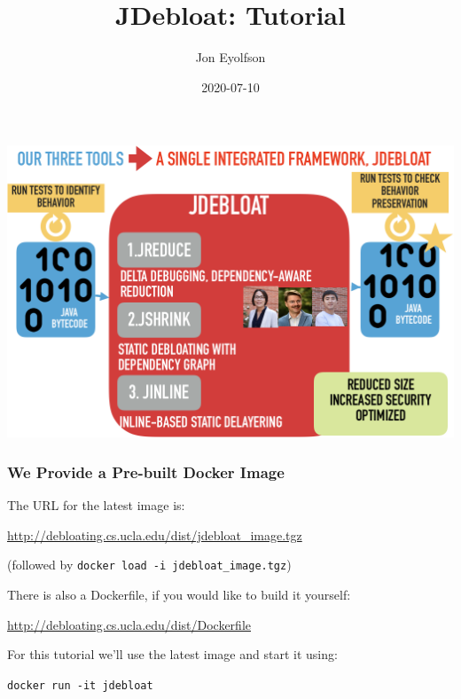 \documentclass[aspectratio=169]{beamer}
\title{JDebloat: Tutorial}
\author{Jon Eyolfson}
\date{2020-07-10}
\begin{document}
  \begin{frame}[plain]
    \titlepage
  \end{frame}

  \setcounter{framenumber}{0}

  \begin{frame}
    \centering
    \includegraphics[scale=0.3]{pi-overview.png}
  \end{frame}

  \begin{frame}
    \frametitle{We Provide a Pre-built Docker Image}

    The URL for the latest image is:

    \url{http://debloating.cs.ucla.edu/dist/jdebloat_image.tgz}

    (followed by \texttt{docker load -i jdebloat\_image.tgz})

    \vspace{1em}

    There is also a Dockerfile, if you would like to build it yourself:

    \url{http://debloating.cs.ucla.edu/dist/Dockerfile}

    \vspace{3em}

    For this tutorial we'll use the latest image and start it using:

    \texttt{docker run -it jdebloat}

  \end{frame}
\end{document}
